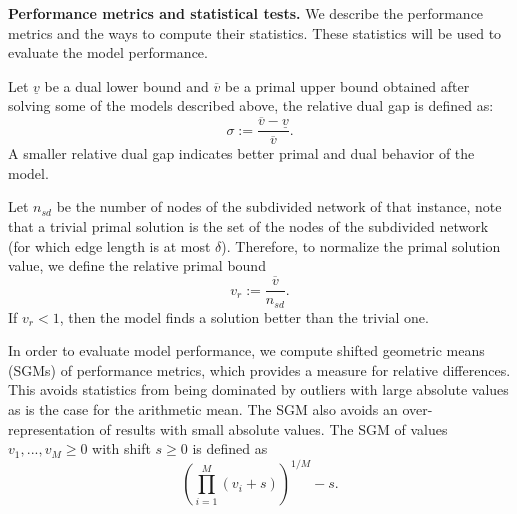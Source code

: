 \documentclass[review]{elsarticle}
\newcommand{\dlt}{{\delta}}
\newcommand{\problem}{CSCP$_\dlt$}
\theoremstyle{definition}
\begin{document}
 
\textbf{Performance metrics and statistical tests.}
We describe the performance metrics and the ways to compute  their statistics. These statistics will be used to evaluate the model performance.

Let $\underline{v}$ be a dual lower bound and $\overline{v}$ be a primal upper bound obtained after solving some of the models described above,  the relative dual gap   is defined as:
\begin{equation*}
   \sigma := \frac{\overline{v} - \underline{v}}{\overline{v}}.
\end{equation*}
A smaller relative dual gap indicates better primal and dual behavior of the model.
 
Let $n_{sd}$ be the number of nodes of the subdivided network of that instance, note that  a trivial primal solution is the set of the nodes of the subdivided network (for which edge length is at most $\dlt$). Therefore, to normalize the primal solution value, we define the relative primal bound  $$v_r := \frac{\overline{v}}{n_{sd}} .$$ If $v_r < 1$, then the model finds a solution better than the trivial one.

 \begin{comment}
 For a \problem  \,  instance, let $\underline{v^\ast}$ be the best dual lower bound and $\overline{v^\ast}$ be the best primal upper bound found among the first five models. For one of the first five models,  the closed primal gap is defined as:
 \begin{equation*}
   \delta_d := \frac{ \max\{\overline{v^\ast} - \underline{v^\ast}, 1e^{-6}\}}{ \max\{\overline{v}- \underline{v}^\ast, 1e^{-6}\}}.
\end{equation*}  A larger closed primal gap indicates better primal  performance (finding primal solutions) of the model.

The closed dual gap  is defined as:
 \begin{equation*}
   \delta_p := \frac{ \max\{\overline{v^\ast} - \underline{v^\ast}, 1e^{-6}\}}{ \max\{\overline{v^\ast}- \underline{v}, 1e^{-6}\}} .
\end{equation*} A larger closed dual gap indicates better dual  performance (proving the optimality) of the model.
 \end{comment}
 
In order to evaluate model performance, we compute shifted geometric means (SGMs) of performance metrics, which provides a
measure for relative differences. This avoids statistics from being dominated by outliers with
large absolute values as is the case for the arithmetic mean. The SGM also avoids an over-representation of results with small absolute values.  The SGM of values $v_1,...,v_M \geq 0$ with shift $s \geq 0$ is defined
as
\begin{equation*}
  \left(\prod_{i=1}^M (v_i + s)\right)^{1/M} - s.
\end{equation*}
\end{document}
